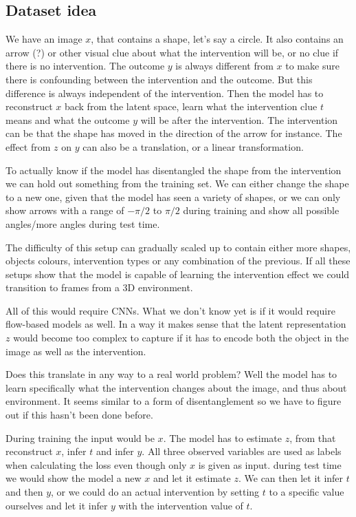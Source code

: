 \documentclass{article}
\begin{document}

\subsection{Dataset idea}
We have an image $x$, that contains a shape, let's say a circle. It also contains an arrow (?) or other visual clue about what the intervention will be, or no clue if there is no intervention. The outcome $y$ is always different from $x$ to make sure there is confounding between the intervention and the outcome. But this difference is always independent of the intervention. Then the model has to reconstruct $x$ back from the latent space, learn what the intervention clue $t$ means and what the outcome $y$ will be after the intervention. The intervention can be that the shape has moved in the direction of the arrow for instance. The effect from $z$ on $y$ can also be a translation, or a linear transformation.

To actually know if the model has disentangled the shape from the intervention we can hold out something from the training set. We can either change the shape to a new one, given that the model has seen a variety of shapes, or we can only show arrows with a range of $-\pi/2$ to $\pi/2$ during training and show all possible angles/more angles during test time.

The difficulty of this setup can gradually scaled up to contain either more shapes, objects colours, intervention types or any combination of the previous. If all these setups show that the model is capable of learning the intervention effect we could transition to frames from a 3D environment.

All of this would require CNNs. What we don't know yet is if it would require flow-based models as well. In a way it makes sense that the latent representation $z$ would become too complex to capture if it has to encode both the object in the image as well as the intervention. 

Does this translate in any way to a real world problem? Well the model has to learn specifically what the intervention changes about the image, and thus about environment. It seems similar to a form of disentanglement so we have to figure out if this hasn't been done before.

During training the input would be $x$. The model has to estimate $z$, from that reconstruct $x$, infer $t$ and infer $y$. All three observed variables are used as labels when calculating the loss even though only $x$ is given as input. during test time we would show the model a new $x$ and let it estimate $z$. We can then let it infer $t$ and then $y$, or we could do an actual intervention by setting $t$ to a specific value ourselves and let it infer $y$ with the intervention value of $t$.
\end{document}
